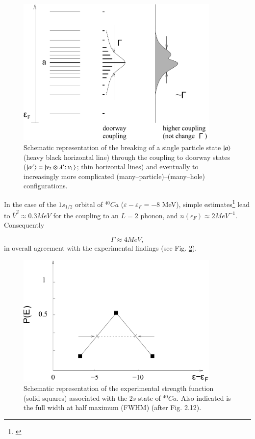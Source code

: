 \begin{figure}
\centerline {
\includegraphics*[width=10cm]{introduccion/figs/figintroD7}
}
\caption{Schematic representation of the breaking of a single particle state $|{a} \rangle$ (heavy black horizontal line) through the coupling to doorway states ($|{\alpha'} \rangle=|{\nu_2\otimes\lambda';\nu_1} \rangle$; thin horizontal lines) and eventually to increasingly more complicated (many--particle)--(many--hole) configurations.}
\label{fig:4.7}
\end{figure}

In the case of the $1s_{1/2}$ orbital of $^{40}Ca$ ($\varepsilon - \varepsilon_F = -8$ MeV), simple estimates\footnote{\cite{Mahaux:85}} lead to $\bar{V}^2 \approx 0.3 MeV$ for the coupling to an $L=2$ phonon, and $n(\epsilon_F) \approx 2MeV^{-1}$. Consequently

\begin{equation}
\Gamma \approx 4 MeV ,
\label{eqn:46}
\end{equation}
in overall agreement with the experimental findings (see Fig. \ref{fig:4.8}).
\begin{figure}[h!]
\centerline {
\includegraphics*[width=10cm]{introduccion/figs/figintroD8}
}
\caption{Schematic representation of the experimental strength function (solid squares) associated with the $2s$ state of $^{40}Ca$. Also indicated is the full width at half maximum (FWHM) (after \cite{Mahaux:85} Fig. 2.12).}
\label{fig:4.8}
\end{figure}

